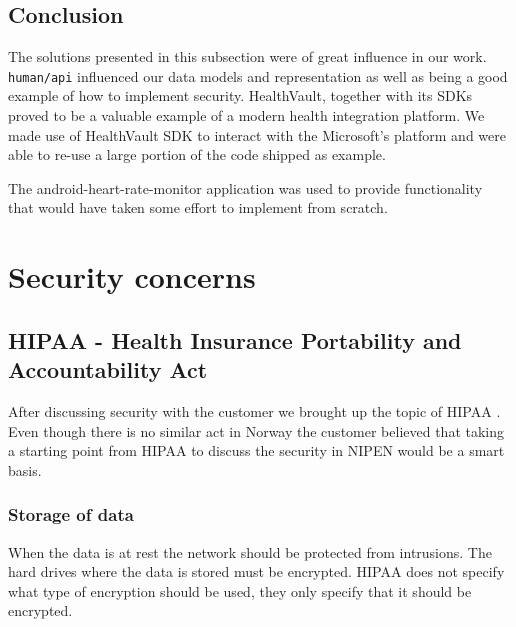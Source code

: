 \subsection{Conclusion}

The solutions presented in this subsection were of great influence in our work.
\verb|human/api| influenced our data models and representation as well as being a good example of how to implement security.
HealthVault, together with its SDKs proved to be a valuable example of a modern health integration platform.
We made use of HealthVault SDK to interact with the Microsoft's platform and were able to re-use a large portion of the code shipped as example.

The android-heart-rate-monitor application was used to provide functionality that would have taken some effort to implement from scratch.



\section{Security concerns}

\subsection{HIPAA - Health Insurance Portability and Accountability Act}

After discussing security with the customer we brought up the topic of HIPAA \cite{HIPAA}. 
Even though there is no similar act in Norway the customer believed that taking a starting point from HIPAA to discuss the security in NIPEN would be a smart basis. 

\subsubsection{Storage of data}
When the data is at rest the network should be protected from intrusions.
The hard drives where the data is stored must be encrypted. \cite{Encryption}
HIPAA does not specify what type of encryption should be used, they only specify that it should be encrypted.

